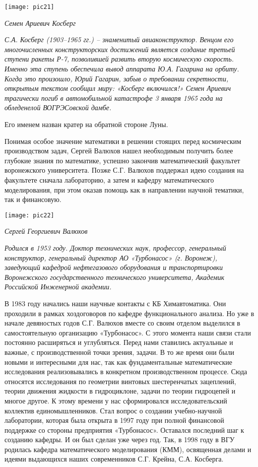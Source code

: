 \begin{center}

\texttt{[image: pic21]}


{\it Семен Ариевич Косберг}
\end{center}

{\it С.А. Косберг (1903–1965 гг.) – знаменитый авиаконструктор. Венцом его многочисленных конструкторских достижений является создание третьей ступени ракеты Р-7, позволившей развить вторую космическую скорость. Именно эта ступень обеспечила вывод аппарата Ю.А. Гагарина на орбиту. Когда это произошло, Юрий Гагарин, забыв о требовании секретности, открытым текстом сообщил миру: «Косберг включился!» Семен Ариевич трагически погиб в автомобильной катастрофе 3 января 1965 года на обледенелой ВОГРЭСовской дамбе.

Его именем назван кратер на обратной стороне Луны.
}

Понимая особое значение математики в решении стоящих перед космическим производством задач, Сергей Валюхов нашел необходимым получить более глубокие знания по математике, успешно закончив математический факультет воронежского университета.
 Позже С.Г. Валюхов поддержал идею создания на факультете сначала лабораторию, а затем и кафедру математического моделирования, при этом оказав помощь как в направлении научной тематики, так и финансовую.


\begin{center}

\texttt{[image: pic22]}


{\it Сергей Георгиевич Валюхов}
\end{center}

{\it Родился в 1953 году. Доктор технических наук, профессор, генеральный конструктор, генеральный директор АО «Турбонасос» (г. Воронеж), заведующий кафедрой нефтегазового оборудования и транспортировки Воронежского государственного технического университета, Академик Российской Инженерной академии.}

В 1983 году начались наши научные контакты с КБ Химавтоматика. Они проходили в рамках хоздоговоров по кафедре функционального анализа. Но уже в начале девяностых годов С.Г. Валюхов вместе со своим отделом выделился в самостоятельную организацию «Турбонасос».  С этого момента наши связи стали постоянно расширяться и углубляться. Перед нами ставились актуальные и важные, с производственной точки зрения, задачи. В то же время они были новыми и интересными для нас, так как фундаментальные математические исследования реализовывались в конкретном производственном процессе. Сюда относятся исследования по геометрии винтовых шестеренчатых зацеплений, теории движения жидкости в гидроциклоне, задачи по теории гидроцепей и многое другое.
К этому времени у нас сформировался исследовательский коллектив единомышленников. Стал вопрос о создании учебно-научной лаборатории, которая была открыта в 1997 году при полной финансовой поддержке со стороны предприятия «Турбонасос». Оставался последний шаг к созданию кафедры. И он был сделан уже через год. Так, в 1998 году в ВГУ родилась кафедра математического моделирования (КММ), освященная делами и идеями выдающихся наших современников С.Г. Крейна, С.А. Косберга.

